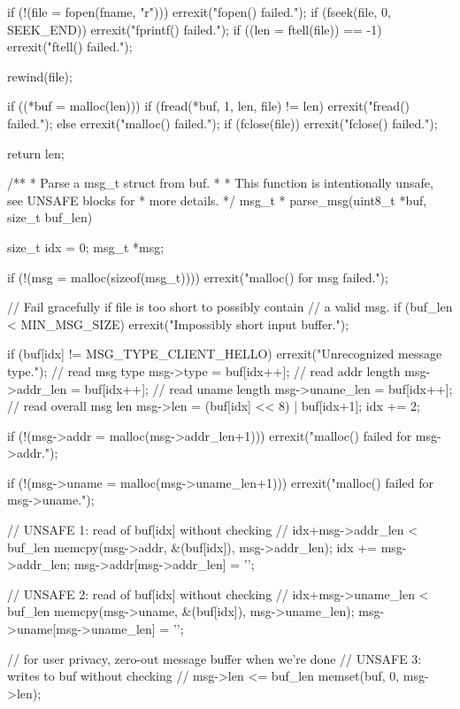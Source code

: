 \begin{appendices}
\begin{TCBlisting}[language={[ANSI]C},basicstyle=\scriptsize,caption={\mylstcaption}]
{    if (!(file = fopen(fname, "r"))) {
        errexit("fopen() failed.\n");
    }
    if (fseek(file, 0, SEEK_END)) {
        errexit("fprintf() failed.\n");
    }
    if ((len = ftell(file)) == -1) {
        errexit("ftell() failed.\n");
    }

    rewind(file);

    if ((*buf = malloc(len))) {
        if (fread(*buf, 1, len, file) != len) {
            errexit("fread() failed.\n");
        }
    } else {
        errexit("malloc() failed.\n");
    }
    if (fclose(file)) {
        errexit("fclose() failed.\n");
    }

    return len;
}

/**
 * Parse a msg_t struct from buf.
 *
 * This function is intentionally unsafe, see UNSAFE blocks for
 * more details.
 */
msg_t *
parse_msg(uint8_t *buf, size_t buf_len) {
    size_t idx = 0;
    msg_t *msg;

    if (!(msg = malloc(sizeof(msg_t)))) {
        errexit("malloc() for msg failed.\n");
    }

    // Fail gracefully if file is too short to possibly contain
    // a valid msg.
    if (buf_len < MIN_MSG_SIZE) {
        errexit("Impossibly short input buffer.\n");
    }

    if (buf[idx] != MSG_TYPE_CLIENT_HELLO) {
        errexit("Unrecognized message type.\n");
    }
    // read msg type
    msg->type = buf[idx++];
    // read addr length
    msg->addr_len = buf[idx++];
    // read uname length
    msg->uname_len = buf[idx++];
    // read overall msg len
    msg->len = (buf[idx] << 8) | buf[idx+1];
    idx += 2;

    if (!(msg->addr = malloc(msg->addr_len+1))) {
        errexit("malloc() failed for msg->addr.\n");
    }

    if (!(msg->uname = malloc(msg->uname_len+1))) {
        errexit("malloc() failed for msg->uname.\n");
    }

    // UNSAFE 1: read of buf[idx] without checking
    //           idx+msg->addr_len < buf_len
    memcpy(msg->addr, &(buf[idx]), msg->addr_len);
    idx += msg->addr_len;
    msg->addr[msg->addr_len] = '\0';

    // UNSAFE 2: read of buf[idx] without checking
    //           idx+msg->uname_len < buf_len
    memcpy(msg->uname, &(buf[idx]), msg->uname_len);
    msg->uname[msg->uname_len] = '\0';

    // for user privacy, zero-out message buffer when we're done
    // UNSAFE 3: writes to buf without checking
    //           msg->len <= buf_len
    memset(buf, 0, msg->len);

}
\end{TCBlisting}
\end{appendices}
